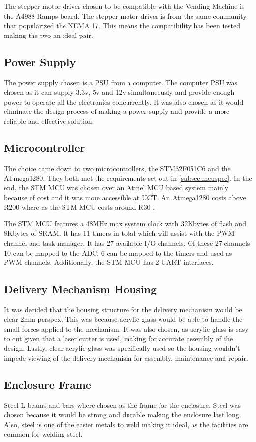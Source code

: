 \documentclass[a4paper,11pt]{article}
\newcommand*{\halfref}[1]{\hyperref[{#1}]{\autoref*{#1}}}
\numberwithin{figure}{section}
\numberwithin{table}{section}
\begin{document}
The stepper motor driver chosen to be compatible with the Vending Machine is the A4988 Ramps board. The stepper motor driver is from the same community that popularized the NEMA 17. This means the compatibility has been tested making the two an ideal pair.

\subsection{Power Supply}
The power supply chosen is a PSU from a computer. The computer PSU was chosen as it can supply 3.3v, 5v and 12v simultaneously and provide enough power to operate all the electronics concurrently. It was also chosen as it would eliminate the design process of making a power supply and provide a more reliable and effective solution.

\subsection{Microcontroller}
The choice came down to two microcontrollers, the STM32F051C6 and the ATmega1280. They both met the requirements set out in \halfref{subsec:mcuspec}. In the end, the STM MCU was chosen over an Atmel MCU based system mainly because of cost and it was more accessible at UCT. An Atmega1280 costs above R200 where as the STM MCU costs around R30 \cite{rsonline}. 

The STM MCU features a 48MHz max system clock with 32Kbytes of flash and 8Kbytes of SRAM. It has 11 timers in total which will assist with the PWM channel and task manager. It has 27 available I/O channels. Of these 27 channels 10 can be mapped to the ADC, 6 can be mapped to the timers and used as PWM channels. Additionally, the STM MCU has 2 UART interfaces.

\subsection{Delivery Mechanism Housing}
It was decided that the housing structure for the delivery mechanism would be clear 2mm perspex. This was because acrylic glass would be able to handle the small forces applied to the mechanism. It was also chosen, as acrylic glass is easy to cut given that a laser cutter is used, making for accurate assembly of the design. Lastly, clear acrylic glass was specifically used so the housing wouldn't impede viewing of the delivery mechanism for assembly, maintenance and repair. 

\subsection{Enclosure Frame}
Steel L beams and bars where chosen as the frame for the enclosure. Steel was chosen because it would be strong and durable making the enclosure last long. Also, steel is one of the easier metals to weld making it ideal, as the facilities are common for welding steel.
\end{document}
